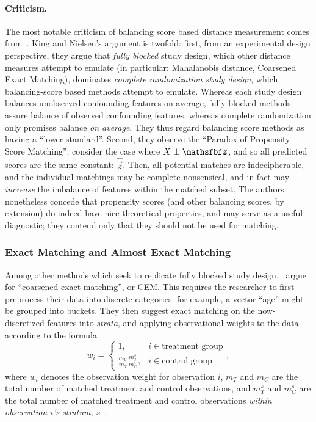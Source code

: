 \documentclass[11pt]{extarticle}
\begin{document}
\paragraph{Criticism.} The most notable criticism of balancing score based distance measurement comes from~\textcite{king_why_2019}. King and Nielsen's argument is twofold: first, from an experimental design perspective, they argue that \emph{fully blocked} study design, which other distance measures attempt to emulate (in particular: Mahalanobis distance, Coarsened Exact Matching), dominates \emph{complete randomization study design}, which balancing-score based methods attempt to emulate.
Whereas each study design balances unobserved confounding features on average, fully blocked methods assure balance of observed confounding features, whereas complete randomization only promises balance \emph{on average}.
They thus regard balancing score methods as having a ``lower standard''.
Second, they observe the ``Paradox of Propensity Score Matching'': consider the case where $\mat{X} \perp \vec{z}$, and so all predicted scores are the same constant: $\hat{\vec{z}}$.
Then, all potential matches are indecipherable, and the individual matchings may be complete nonsensical, and in fact may \emph{increase} the imbalance of features within the matched subset. The authors nonetheless concede that propensity scores (and other balancing scores, by extension) do indeed have nice theoretical properties, and may serve as a useful diagnostic; they contend only that they should not be used for matching.

\subsubsection{Exact Matching and Almost Exact Matching}
\label{subsubsec:exactmatching}

Among other methods which seek to replicate fully blocked study design,~\textcite{king_why_2019} argue for ``coarsened exact matching'', or CEM. This requires the researcher to first preprocess their data into discrete categories: for example, a vector ``age'' might be grouped into buckets. They then suggest exact matching on the now-discretized features into \emph{strata}, and applying observational weights to the data according to the formula
\begin{equation}
  w_{i}= \begin{cases}1, & i \in \text{treatment group} \\ \frac{m_{C}}{m_{T}} \frac{m_{T}^{s}}{m_{C}^{s}}, & i \in \text{control group} \end{cases},
\end{equation}
where $w_i$ denotes the observation weight for observation $i$, $m_T$ and $m_C$ are the total number of matched treatment and control observations, and $m_T^s$ and $m_C^s$ are the total number of matched treatment and control observations \emph{within observation $i$'s stratum, $s$}~\parencite{iacus_causal_2012}.
\end{document}
